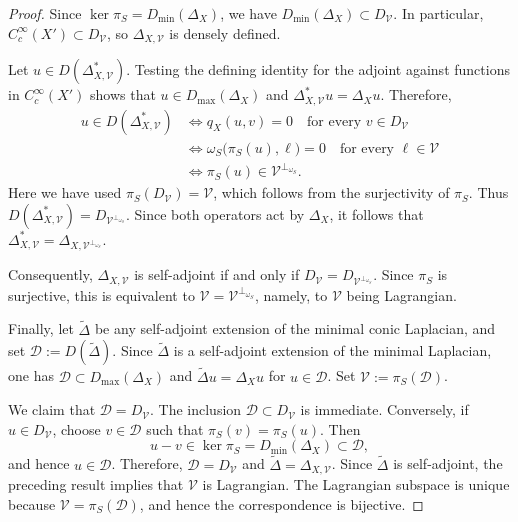 \documentclass[12pt]{amsart}
\theoremstyle{plain}
\theoremstyle{definition}
\theoremstyle{remark}
\numberwithin{equation}{section} \numberwithin{figure}{section}
\begin{document}
\begin{proof}
Since \(\ker\pi_S=D_{\min}(\Delta_X)\), we have
\(D_{\min}(\Delta_X)\subset D_{\mathcal V}\). In particular,
\(C_c^\infty(X')\subset D_{\mathcal V}\), so
\(\Delta_{X,\mathcal V}\) is densely defined.

Let \(u\in D(\Delta_{X,\mathcal V}^{*})\). Testing the defining
identity for the adjoint against functions in \(C_c^\infty(X')\)
shows that \(u\in D_{\max}(\Delta_X)\) and
\(\Delta_{X,\mathcal V}^{*}u=\Delta_Xu\). Therefore,
\[
\begin{aligned}
u\in D(\Delta_{X,\mathcal V}^{*})
&\Longleftrightarrow
q_X(u,v)=0
\quad\text{for every }v\in D_{\mathcal V} \\
&\Longleftrightarrow
\omega_S\bigl(\pi_S(u),\ell\bigr)=0
\quad\text{for every }\ell\in\mathcal V \\
&\Longleftrightarrow
\pi_S(u)\in\mathcal V^{\perp_{\omega_S}}.
\end{aligned}
\]
Here we have used
\(\pi_S(D_{\mathcal V})=\mathcal V\), which follows from the
surjectivity of \(\pi_S\). Thus
\(D(\Delta_{X,\mathcal V}^{*})
=D_{\mathcal V^{\perp_{\omega_S}}}\). Since both operators act by
\(\Delta_X\), it follows that
\(\Delta_{X,\mathcal V}^{*}
=\Delta_{X,\mathcal V^{\perp_{\omega_S}}}\).

Consequently, \(\Delta_{X,\mathcal V}\) is self-adjoint if and only if
\(D_{\mathcal V}=D_{\mathcal V^{\perp_{\omega_S}}}\). Since
\(\pi_S\) is surjective, this is equivalent to
\(\mathcal V=\mathcal V^{\perp_{\omega_S}}\), namely, to
\(\mathcal V\) being Lagrangian.

Finally, let \(\widetilde{\Delta}\) be any self-adjoint extension of
the minimal conic Laplacian, and set
\(\mathcal D:=D(\widetilde{\Delta})\). Since
\(\widetilde{\Delta}\) is a self-adjoint extension of the minimal
Laplacian, one has
\(\mathcal D\subset D_{\max}(\Delta_X)\) and
\(\widetilde{\Delta}u=\Delta_Xu\) for \(u\in\mathcal D\).
Set \(\mathcal V:=\pi_S(\mathcal D)\).

We claim that \(\mathcal D=D_{\mathcal V}\). The inclusion
\(\mathcal D\subset D_{\mathcal V}\) is immediate. Conversely, if
\(u\in D_{\mathcal V}\), choose \(v\in\mathcal D\) such that
\(\pi_S(v)=\pi_S(u)\). Then
\[
    u-v\in\ker\pi_S
    =
    D_{\min}(\Delta_X)
    \subset\mathcal D,
\]
and hence \(u\in\mathcal D\). Therefore,
\(\mathcal D=D_{\mathcal V}\) and
\(\widetilde{\Delta}=\Delta_{X,\mathcal V}\).
Since \(\widetilde{\Delta}\) is self-adjoint, the preceding result
implies that \(\mathcal V\) is Lagrangian. The Lagrangian subspace is
unique because \(\mathcal V=\pi_S(\mathcal D)\), and hence the
correspondence is bijective.
\end{proof}
\end{document}
